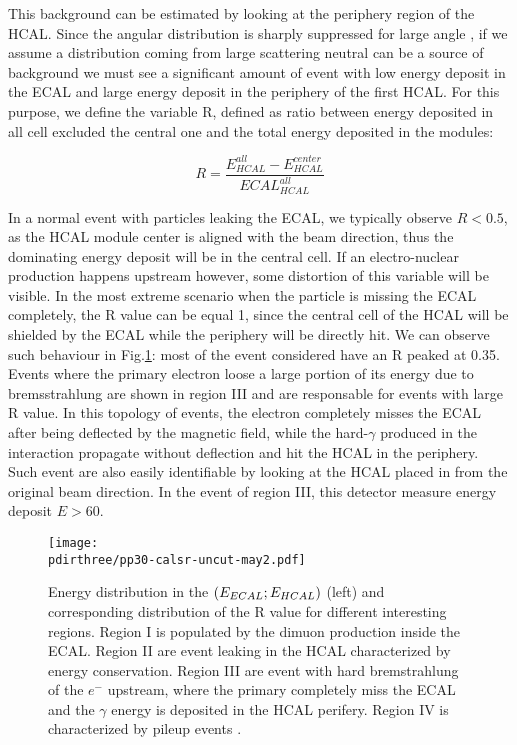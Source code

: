 This background can be estimated by looking at the periphery region of the HCAL. Since the angular distribution is sharply suppressed for large angle \cite{AUTIERO1998285,GNINENKO1998583}, if we assume a distribution coming from large scattering neutral can be a source of background we must see a significant amount of event with low energy deposit in the ECAL and large energy deposit in the periphery of the first HCAL. For this purpose, we define the variable R, defined as ratio between energy deposited in all cell excluded the central one and the total energy deposited in the modules:

\begin{equation}
  \label{eq:R-factor}
  R = \frac{E^{all}_{HCAL} - E^{center}_{HCAL}}{ECAL^{all}_{HCAL}}
\end{equation}

In a normal event with particles leaking the ECAL, we typically observe $R<0.5$, as the HCAL module center is aligned with the beam direction, thus the dominating energy deposit will be in the central cell. If an electro-nuclear production happens upstream however, some distortion of this variable will be visible. In the most extreme scenario when the particle is missing the ECAL completely, the R value can be equal 1, since the central cell of the HCAL will be shielded by the ECAL while the periphery will be directly hit. We can observe such behaviour in Fig.\ref{fig:r-value-csample}: most of the event considered have an R peaked at 0.35. Events where the primary electron loose a large portion of its energy due to bremsstrahlung are shown in region III and are responsable for events with large R value. In this topology of events, the electron completely misses the ECAL after being deflected by the magnetic field, while the hard-$\gamma$ produced in the interaction propagate without deflection and hit the HCAL in the periphery. Such event are also easily identifiable by looking at the HCAL placed in from the original beam direction. In the event of region III, this detector measure energy deposit $E>60$\gev.

\begin{figure}[bth!]
  \centering
  \texttt{[image: \\pdirthree/pp30-calsr-uncut-may2.pdf]}
  \caption[R value for control sample]{Energy distribution in the $(E_{ECAL};E_{HCAL})$ (left) and corresponding distribution of the R value for different interesting regions. Region I is populated by the dimuon production inside the ECAL. Region II are event leaking in the HCAL characterized by energy conservation. Region III are event with hard bremstrahlung of the $e^-$ upstream, where the primary completely miss the ECAL and the $\gamma$ energy is deposited in the HCAL perifery. Region IV is characterized by pileup events \cite{pdegen-thesis}.}
  \label{fig:r-value-csample}
\end{figure}

